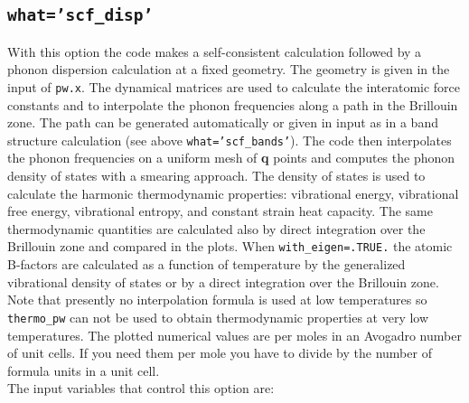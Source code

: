 \documentclass[12pt,a4paper]{article}
\begin{document}
\subsection{\color{web-blue}\texttt{what='scf\_disp'}}
With this option the code makes a self-consistent calculation followed by
a phonon dispersion calculation at a fixed geometry. The geometry is given in the 
input of \texttt{pw.x}. The dynamical matrices are used to calculate 
the interatomic force constants and to interpolate the phonon frequencies 
along a path in the Brillouin zone. The path can be generated automatically 
or given in input as in a band structure calculation (see above \texttt{what='scf\_bands'}). The code then 
interpolates the phonon frequencies on a uniform mesh of {\bf q} points and 
computes the phonon density of states with a smearing approach. The density of 
states is used to calculate the harmonic thermodynamic properties: 
vibrational energy, vibrational free energy, vibrational entropy, and 
constant strain heat capacity.
The same thermodynamic quantities are calculated also by direct 
integration over the Brillouin zone and compared in the plots.
When \texttt{with\_eigen=.TRUE.} the atomic B-factors are
calculated as a function of temperature by the generalized vibrational 
density of states or by a direct integration over 
the Brillouin zone.
Note that presently no interpolation formula is used at low temperatures
so \texttt{thermo\_pw} can not be used to obtain thermodynamic 
properties at very low temperatures. 
The plotted numerical values are per moles in an Avogadro number of unit 
cells. If you need them per mole you have to divide by the number 
of formula units in a unit cell. \\
The input variables that control this option are:
\end{document}
